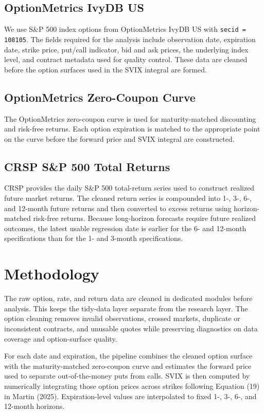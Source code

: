 \documentclass[11pt]{article}
\begin{document}
\subsection{OptionMetrics IvyDB US}

We use S\&P 500 index options from OptionMetrics IvyDB US with \texttt{secid = 108105}. The fields required for the analysis include observation date, expiration date, strike price, put/call indicator, bid and ask prices, the underlying index level, and contract metadata used for quality control. These data are cleaned before the option surfaces used in the SVIX integral are formed.

\subsection{OptionMetrics Zero-Coupon Curve}

The OptionMetrics zero-coupon curve is used for maturity-matched discounting and risk-free returns. Each option expiration is matched to the appropriate point on the curve before the forward price and SVIX integral are constructed.

\subsection{CRSP S\&P 500 Total Returns}

CRSP provides the daily S\&P 500 total-return series used to construct realized future market returns. The cleaned return series is compounded into 1-, 3-, 6-, and 12-month future returns and then converted to excess returns using horizon-matched risk-free returns. Because long-horizon forecasts require future realized outcomes, the latest usable regression date is earlier for the 6- and 12-month specifications than for the 1- and 3-month specifications.

\section{Methodology}

The raw option, rate, and return data are cleaned in dedicated modules before analysis. This keeps the tidy-data layer separate from the research layer. The option cleaning removes invalid observations, crossed markets, duplicate or inconsistent contracts, and unusable quotes while preserving diagnostics on data coverage and option-surface quality.

For each date and expiration, the pipeline combines the cleaned option surface with the maturity-matched zero-coupon curve and estimates the forward price used to separate out-of-the-money puts from calls. SVIX is then computed by numerically integrating those option prices across strikes following Equation (19) in Martin (2025). Expiration-level values are interpolated to fixed 1-, 3-, 6-, and 12-month horizons.
\end{document}
